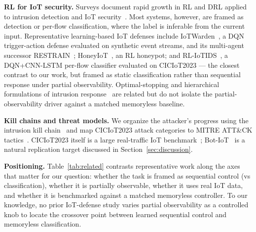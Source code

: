 \documentclass[3p,twocolumn]{elsarticle}
\begin{document}
\noindent\textbf{RL for IoT security.} Surveys document rapid growth in RL and DRL
applied to intrusion detection and IoT
security~\cite{Uprety2021,Chen2021}. Most
systems, however, are framed as detection or per-flow classification,
where the label is inferable from the current input. Representative
learning-based IoT defenses include IoTWarden~\cite{Alam2024}, a DQN
trigger-action defense evaluated on synthetic event streams, and its
multi-agent successor RESTRAIN~\cite{Alam2025}; HoneyIoT~\cite{Guan2023}, an RL
honeypot; and RL-IoTIDS~\cite{Odeh2026}, a DQN+CNN-LSTM per-flow classifier
evaluated on CICIoT2023 --- the closest contrast to our work, but framed as
static classification rather than sequential response under partial
observability. Optimal-stopping and hierarchical formulations of intrusion
response~\cite{Hammar2022} are related but do not isolate the
partial-observability driver against a matched memoryless baseline.

\smallskip\noindent\textbf{Kill chains and threat models.} We organize the attacker's progress
using the intrusion kill chain~\cite{Hutchins2011} and map CICIoT2023 attack
categories to MITRE ATT\&CK tactics~\cite{MITRE2023}. CICIoT2023 itself is a
large real-traffic IoT benchmark~\cite{Neto2023}; Bot-IoT~\cite{Koroniotis2019}
is a natural replication target discussed in Section~\ref{sec:discussion}.

\smallskip\noindent\textbf{Positioning.} Table~\ref{tab:related} contrasts representative work
along the axes that matter for our question: whether the task is framed as
sequential control (vs classification), whether it is partially observable,
whether it uses real IoT data, and whether it is benchmarked against a matched
memoryless controller. To our knowledge, no prior IoT-defense study varies
partial observability as a controlled knob to locate the crossover point
between learned sequential control and memoryless classification.
\end{document}

